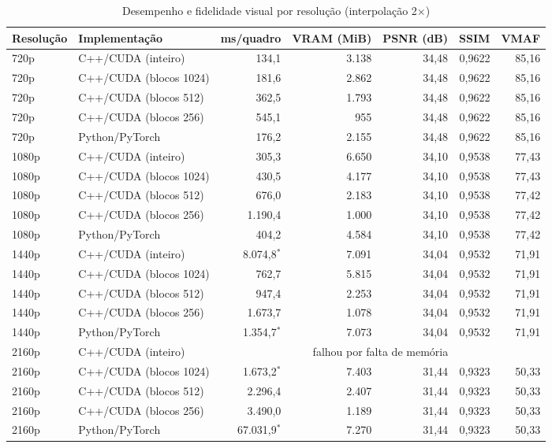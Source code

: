 \begin{table}[htb]
\centering
\caption{Desempenho e fidelidade visual por resolução (interpolação 2$\times$)}
\label{tab:resultados_gta}
\small
\begin{tabular}{llrrrrr}
\toprule
\textbf{Resolução} & \textbf{Implementação} & \textbf{ms/quadro} & \textbf{VRAM (MiB)} & \textbf{PSNR (dB)} & \textbf{SSIM} & \textbf{VMAF} \\
\midrule
720p & C++/CUDA (inteiro) & 134,1 & 3.138 & 34,48 & 0,9622 & 85,16 \\
720p & C++/CUDA (blocos 1024) & 181,6 & 2.862 & 34,48 & 0,9622 & 85,16 \\
720p & C++/CUDA (blocos 512) & 362,5 & 1.793 & 34,48 & 0,9622 & 85,16 \\
720p & C++/CUDA (blocos 256) & 545,1 & 955 & 34,48 & 0,9622 & 85,16 \\
720p & Python/PyTorch & 176,2 & 2.155 & 34,48 & 0,9622 & 85,16 \\
\midrule
1080p & C++/CUDA (inteiro) & 305,3 & 6.650 & 34,10 & 0,9538 & 77,43 \\
1080p & C++/CUDA (blocos 1024) & 430,5 & 4.177 & 34,10 & 0,9538 & 77,43 \\
1080p & C++/CUDA (blocos 512) & 676,0 & 2.183 & 34,10 & 0,9538 & 77,42 \\
1080p & C++/CUDA (blocos 256) & 1.190,4 & 1.000 & 34,10 & 0,9538 & 77,42 \\
1080p & Python/PyTorch & 404,2 & 4.584 & 34,10 & 0,9538 & 77,42 \\
\midrule
1440p & C++/CUDA (inteiro) & 8.074,8$^{*}$ & 7.091 & 34,04 & 0,9532 & 71,91 \\
1440p & C++/CUDA (blocos 1024) & 762,7 & 5.815 & 34,04 & 0,9532 & 71,91 \\
1440p & C++/CUDA (blocos 512) & 947,4 & 2.253 & 34,04 & 0,9532 & 71,91 \\
1440p & C++/CUDA (blocos 256) & 1.673,7 & 1.078 & 34,04 & 0,9532 & 71,91 \\
1440p & Python/PyTorch & 1.354,7$^{*}$ & 7.073 & 34,04 & 0,9532 & 71,91 \\
\midrule
2160p & C++/CUDA (inteiro) & \multicolumn{5}{c}{falhou por falta de memória} \\
2160p & C++/CUDA (blocos 1024) & 1.673,2$^{*}$ & 7.403 & 31,44 & 0,9323 & 50,33 \\
2160p & C++/CUDA (blocos 512) & 2.296,4 & 2.407 & 31,44 & 0,9323 & 50,33 \\
2160p & C++/CUDA (blocos 256) & 3.490,0 & 1.189 & 31,44 & 0,9323 & 50,33 \\
2160p & Python/PyTorch & 67.031,9$^{*}$ & 7.270 & 31,44 & 0,9323 & 50,33 \\
\bottomrule
\end{tabular}
\end{table}
